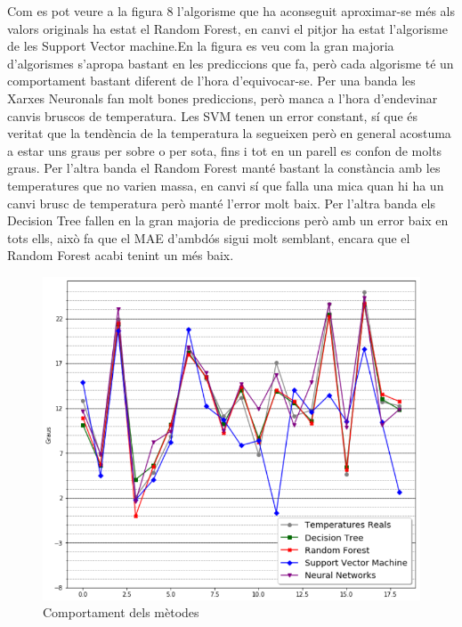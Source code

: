 \documentclass[10pt,a4paper,twocolumn,twoside]{article}
\begin{document}
Com es pot veure a la figura 8 l'algorisme que ha aconseguit aproximar-se més als valors originals ha estat el Random Forest, en canvi el pitjor ha estat l'algorisme de les Support Vector machine.En la figura es veu com la gran majoria d'algorismes s'apropa bastant en les prediccions que fa, però cada algorisme té un comportament bastant diferent de l'hora d'equivocar-se. Per una banda les Xarxes Neuronals fan molt bones prediccions, però manca a l'hora d'endevinar canvis bruscos de temperatura. Les SVM tenen un error constant, sí que és veritat que la tendència de la temperatura la segueixen però en general acostuma a estar uns graus per sobre o per sota, fins i tot en un parell es confon de molts graus.
Per l'altra banda el Random Forest manté bastant la constància amb les temperatures que no varien massa, en canvi sí que falla una mica quan hi ha un canvi brusc de temperatura però manté l'error molt baix. Per l'altra banda els Decision Tree fallen en la gran majoria de prediccions però amb un error baix en tots ells, això fa que el MAE d'ambdós sigui molt semblant, encara que el Random Forest acabi tenint un més baix.

\begin{figure}[!h]
\centering
	\includegraphics[scale=0.4,center]{../img/comparacioAlgs}
	\caption{Comportament dels mètodes}
	\label{fig-temps}
\end{figure}
\end{document}

